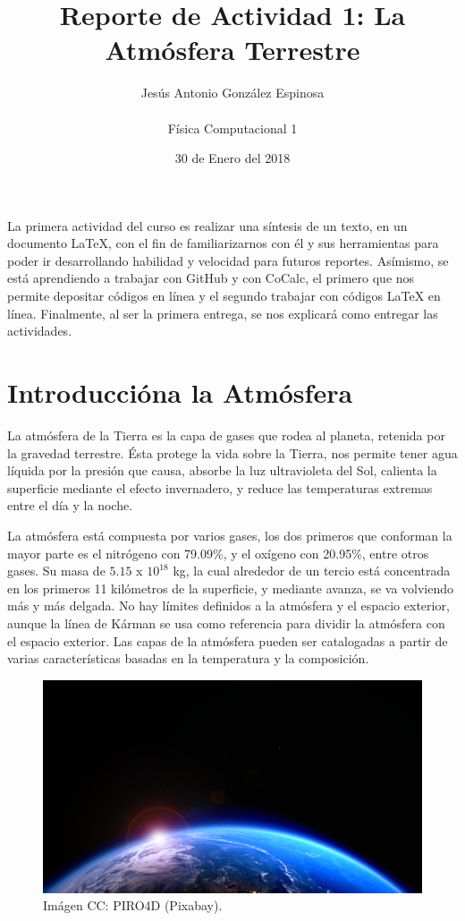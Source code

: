 \documentclass{article}
\title{Reporte de Actividad 1: La Atmósfera Terrestre}
\author{Jesús Antonio González Espinosa \\  \\ Física Computacional 1}
\date{30 de Enero del 2018}
\begin{document}
\maketitle

La primera actividad del curso es realizar una síntesis de un texto, en un documento LaTeX, con el fin de familiarizarnos con él y sus herramientas para poder ir desarrollando habilidad y velocidad para futuros reportes. Asímismo, se está aprendiendo a trabajar con GitHub y con CoCalc, el primero que nos permite depositar códigos en línea y el segundo trabajar con códigos LaTeX en línea. Finalmente, al ser la primera entrega, se nos explicará como entregar las actividades. 

\section{Introduccióna la Atmósfera}
La atmósfera de la Tierra es la capa de gases que rodea al planeta, retenida por la gravedad terrestre. Ésta protege la vida sobre la Tierra, nos permite tener agua líquida por la presión que causa, absorbe la luz ultravioleta del Sol, calienta la superficie mediante el efecto invernadero, y reduce las temperaturas extremas entre el día y la noche.

La atmósfera está compuesta por varios gases, los dos primeros que conforman la mayor parte es el nitrógeno con 79.09\%, y el oxígeno con 20.95\%, entre otros gases. Su masa de $5.15$ x $10^{18}$ kg, la cual alrededor de un tercio está concentrada en los primeros 11 kilómetros de la superficie, y mediante avanza, se va volviendo más y más delgada. No hay límites definidos a la atmósfera y el espacio exterior, aunque la línea de Kárman se usa como referencia para dividir la atmósfera con el espacio exterior. Las capas de la atmósfera pueden ser catalogadas a partir de varias características basadas en la temperatura y la composición.

\begin{figure}[h]
  \centering
  \includegraphics[width=0.6\linewidth]{atmosfera1.png}
  \caption{Imágen CC: PIRO4D (Pixabay).}
\end{figure}
\end{document}
